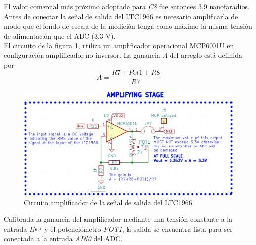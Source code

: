 El valor comercial más próximo adoptado para \textit{C8} fue entonces 3,9 nanofaradios.\\
Antes de conectar la señal de salida del LTC1966 es necesario amplificarla de modo que el fondo de escala de la medición tenga como máximo la misma tensión de alimentación que el ADC (3,3 V).\\
El circuito de la figura \ref{fig:ctoopamp}, utiliza un amplificador operacional MCP6001U \citep{mcp6001} en configuración amplificador no inversor. La ganancia \textit{A} del arreglo est\'{a} definida por
\begin{equation}
	A=\frac{R7+Pot1+R8}{R7}
\end{equation}

\begin{figure}[h!]
	\centering
	\includegraphics[width=0.7\linewidth]{Figures/cto_op_amp}
	\caption{Circuito amplificador de la señal de salida del LTC1966.}
	\label{fig:ctoopamp}
\end{figure}
Calibrada la ganancia del amplificador mediante una tensión constante a la entrada \textit{IN+} y el potenciómetro \textit{POT1}, la salida se encuentra lista para ser conectada a la entrada \textit{AIN0} del ADC.\\

